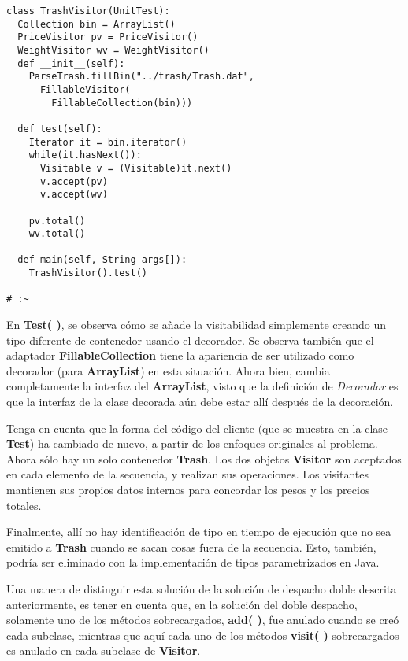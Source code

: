 \begin{lstlisting}
class TrashVisitor(UnitTest): 
  Collection bin = ArrayList() 
  PriceVisitor pv = PriceVisitor() 
  WeightVisitor wv = WeightVisitor() 
  def __init__(self): 
    ParseTrash.fillBin("../trash/Trash.dat",  
      FillableVisitor( 
        FillableCollection(bin))) 
        
  def test(self): 
    Iterator it = bin.iterator() 
    while(it.hasNext()): 
      Visitable v = (Visitable)it.next() 
      v.accept(pv) 
      v.accept(wv) 
      
    pv.total() 
    wv.total() 
    
  def main(self, String args[]): 
    TrashVisitor().test() 
    
# :~ 
\end{lstlisting}

En \textbf{Test( )}, se observa cómo se añade la visitabilidad simplemente creando un tipo diferente de contenedor usando el decorador. Se observa también que el adaptador \textbf{FillableCollection} tiene la apariencia de ser utilizado como decorador (para \textbf{ArrayList}) en esta situación.  Ahora bien, cambia completamente la interfaz del \textbf{ArrayList}, visto que la definición de \textit{Decorador} es que la interfaz de la clase decorada aún debe estar allí después de la decoración.      \newline

Tenga en cuenta que la forma del código del cliente (que se muestra en la clase \textbf{Test}) ha cambiado de nuevo, a partir de los enfoques originales al problema. Ahora sólo hay un solo contenedor \textbf{Trash}. Los dos objetos \textbf{Visitor} son aceptados en cada elemento de la secuencia, y realizan sus operaciones. Los visitantes mantienen sus propios datos internos para concordar los pesos y los precios totales.        \newline

Finalmente, allí no hay identificación de tipo en tiempo de ejecución que no sea emitido a \textbf{Trash} cuando se sacan cosas fuera de la secuencia. Esto, también, podría ser eliminado con la implementación de tipos parametrizados en Java.        \newline

Una manera de distinguir esta solución de la solución de despacho doble descrita anteriormente, es tener en cuenta que, en la solución del doble despacho, solamente uno de los métodos sobrecargados, \textbf{add( )},  fue anulado cuando se creó cada subclase, mientras que aquí cada uno de los métodos \textbf{visit( )} sobrecargados es anulado en cada subclase de \textbf{Visitor}.          \newline

